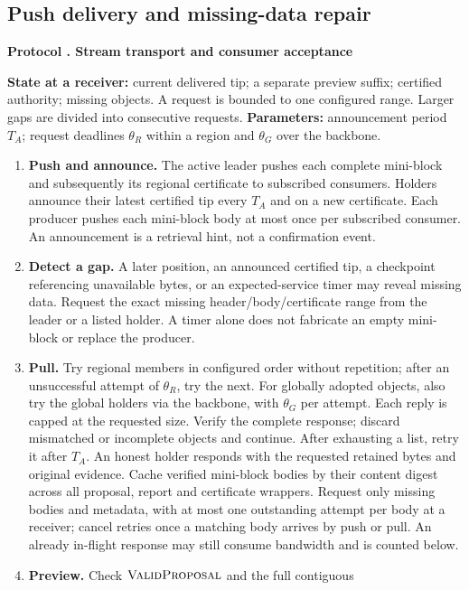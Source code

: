 \documentclass[11pt,a4paper,onecolumn]{article}
\newcommand{\Proc}[1]{\textnormal{\textsc{#1}}}
\theoremstyle{remark}\newtheorem{example}[definition]{Example}
\newcounter{protocol}
\newenvironment{protocol}[2]{\refstepcounter{protocol}\label{#1}\begin{mdframed}[nobreak=true,linewidth=.6pt,skipabove=10pt,skipbelow=10pt,innertopmargin=8pt,innerbottommargin=8pt]\small\raggedright\noindent\textbf{Protocol \theprotocol. #2}\par\smallskip}{\end{mdframed}}
\begin{document}
\subsection{Push delivery and missing-data repair}\label{sec:pull}
\begin{protocol}{alg:pull}{Stream transport and consumer acceptance}
\textbf{State at a receiver:} current delivered tip; a separate preview suffix;
certified authority; missing objects. A request is bounded to one configured
range. Larger gaps are divided into consecutive requests.
\textbf{Parameters:} announcement period $T_A$; request deadlines $\theta_R$
within a region and $\theta_G$ over the backbone.
\begin{enumerate}[label=\textbf{D\arabic*.}]
\item \textbf{Push and announce.} The active leader pushes each complete
mini-block and subsequently its regional certificate to subscribed consumers.
Holders announce their latest certified tip every $T_A$ and on a new certificate.
Each producer pushes each mini-block body at most once per subscribed consumer.
An announcement is a retrieval hint, not a confirmation event.
\item \textbf{Detect a gap.} A later position, an announced certified tip,
a checkpoint referencing unavailable bytes, or an expected-service timer may
reveal missing data. Request the exact missing header/body/certificate range
from the leader or a listed holder. A timer alone does not fabricate an empty
mini-block or replace the producer.
\item \textbf{Pull.} Try regional members in configured order without repetition;
after an unsuccessful attempt of $\theta_R$, try the next. For globally adopted
objects, also try the global holders via the backbone, with $\theta_G$ per attempt.
Each reply is capped at the requested size. Verify the complete response;
discard mismatched or incomplete objects and continue. After exhausting a list,
retry it after $T_A$. An honest holder responds with the requested retained
bytes and original evidence. Cache verified mini-block bodies by their content
digest across all proposal, report and certificate wrappers. Request only
missing bodies and metadata, with at most one outstanding attempt per body
at a receiver; cancel retries once a matching body arrives by push or pull.
An already in-flight response may still consume bandwidth and is counted below.
\item \textbf{Preview.} Check $\Proc{ValidProposal}$ and the full contiguous

\end{enumerate}
\end{protocol}
\end{document}
